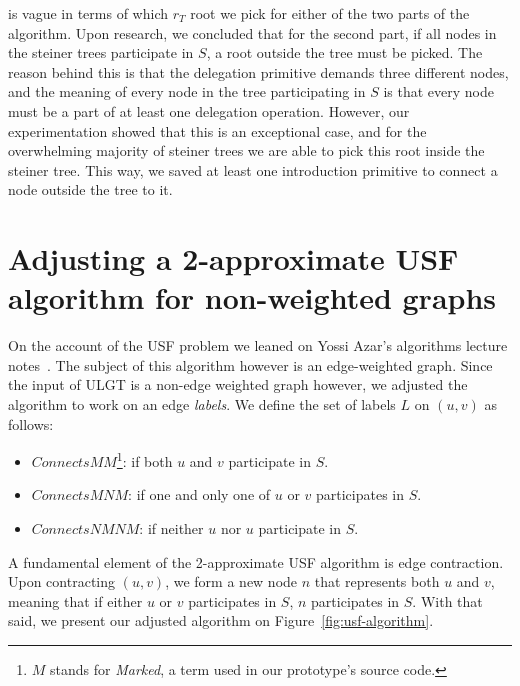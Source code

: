 \documentclass{article}
\begin{document}
\cite{ulgt} is vague in terms of which $r_T$ root we pick for either of the two parts of the algorithm. Upon research, we concluded that for the second part, if all nodes in the steiner trees participate in $S$, a root outside the tree must be picked. The reason behind this is that the delegation primitive demands three different nodes, and the meaning of every node in the tree participating in $S$ is that every node must be a part of at least one delegation operation. However, our experimentation showed that this is an exceptional case, and for the overwhelming majority of steiner trees we are able to pick this root inside the steiner tree. This way, we saved at least one introduction primitive to connect a node outside the tree to it.

\section{Adjusting a 2-approximate USF algorithm for non-weighted graphs}
\label{sec:usf}

On the account of the USF problem we leaned on Yossi Azar's algorithms lecture notes~\cite{usf}. The subject of this algorithm however is an edge-weighted graph. Since the input of ULGT is a non-edge weighted graph however, we adjusted the algorithm to work on an edge \textit{labels}. We define the set of labels $L$ on $(u,v)$ as follows:
\begin{itemize}
  \item $ConnectsMM$\footnote{$M$ stands for \textit{Marked}, a term used in our prototype's source code.}: if both $u$ and $v$ participate in $S$.
  \item $ConnectsMNM$: if one and only one of $u$ or $v$ participates in $S$.
  \item $ConnectsNMNM$: if neither $u$ nor $u$ participate in $S$.
\end{itemize}

A fundamental element of the 2-approximate USF algorithm is edge contraction. Upon contracting $(u,v)$, we form a new node $n$ that represents both $u$ and $v$, meaning that if either $u$ or $v$ participates in $S$, $n$ participates in $S$. With that said, we present our adjusted algorithm on Figure~\ref{fig:usf-algorithm}.
\end{document}
